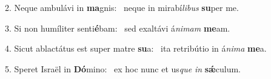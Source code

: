2. Neque ambulávi in \textbf{ma}gnis: \ast\  neque in mirabí\textit{li}\textit{bus} \textbf{su}per me.\

3. Si non humíliter senti\textbf{é}bam: \ast\  sed exaltávi á\textit{ni}\textit{mam} \textbf{me}am.\

4. Sicut ablactátus est super matre \textbf{su}a: \ast\  ita retribútio in á\textit{ni}\textit{ma} \textbf{me}a.\

5. Speret Israël in \textbf{Dó}mino: \ast\  ex hoc nunc et us\textit{que} \textit{in} \textbf{sǽ}culum.\


